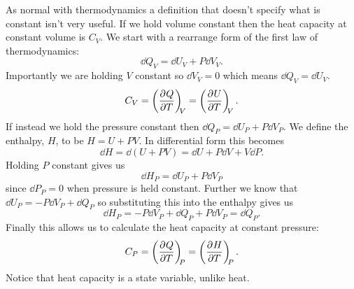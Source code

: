 \documentclass[a4paper]{article}
\begin{document}
    As normal with thermodynamics a definition that doesn't specify what is constant isn't very useful.
    If we hold volume constant then the heat capacity at constant volume is \(C_V\).
    We start with a rearrange form of the first law of thermodynamics:
    \[\dd{Q_V} = \dd{U_V} + P\dd{V_V}.\]
    Importantly we are holding \(V\) constant so \(\dd{V_V} = 0\) which means \(\dd{Q_V} = \dd{U_V}\).
    \[C_V = \left(\pdv[]{Q}{T}\right)_{\!\!{V}} = \left(\pdv[]{U}{T}\right)_{\!\!{V}}.\]
    If instead we hold the pressure constant then \(\dd{Q_P} = \dd{U_P} + P\dd{V_P}\).
    We define the enthalpy, \(H\), to be \(H = U + PV\).
    In differential form this becomes
    \[\dd{H} = \dd{(U + PV)} = \dd{U} + P\dd{V} + V\dd{P}.\]
    Holding \(P\) constant gives us
    \[\dd{H_P} = \dd{U_P} + P\dd{V_P}\]
    since \(\dd{P_P} = 0\) when pressure is held constant.
    Further we know that \(\dd{U_P} = -P\dd{V_P} + \dd{Q_P}\) so substituting this into the enthalpy gives us
    \[\dd{H_P} = -P\dd{V_P} + \dd{Q_P} + P\dd{V_P} = \dd{Q_P}.\]
    Finally this allows us to calculate the heat capacity at constant pressure:
    \[C_P = \left(\pdv[]{Q}{T}\right)_{\!\!{P}} = \left(\pdv[]{H}{T}\right)_{\!\!{P}}.\]
    Notice that heat capacity is a state variable, unlike heat.
    
\end{document}
